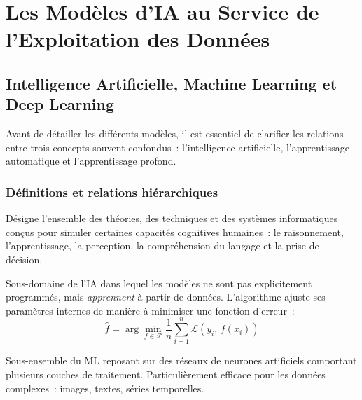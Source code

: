 \chapter{Les Modèles d'IA au Service de l'Exploitation des Données}


\section{Intelligence Artificielle, Machine Learning et Deep Learning}

Avant de détailler les différents modèles, il est essentiel de clarifier les relations entre trois concepts souvent confondus~: l'intelligence artificielle, l'apprentissage automatique et l'apprentissage profond.

\subsection{Définitions et relations hiérarchiques}

\begin{description}[leftmargin=1.5cm, itemsep=4pt]
  \item[Intelligence Artificielle (IA)] Désigne l'ensemble des théories, des techniques et des systèmes informatiques conçus pour simuler certaines capacités cognitives humaines~: le raisonnement, l'apprentissage, la perception, la compréhension du langage et la prise de décision.
  \item[Machine Learning (ML)] Sous-domaine de l'IA dans lequel les modèles ne sont pas explicitement programmés, mais \textit{apprennent} à partir de données. L'algorithme ajuste ses paramètres internes de manière à minimiser une fonction d'erreur~:
  \[
    \hat{f} = \arg\min_{f \in \mathcal{F}} \frac{1}{n}\sum_{i=1}^{n} \mathcal{L}\!\left(y_i,\, f(x_i)\right)
  \]
  \item[Deep Learning (DL)] Sous-ensemble du ML reposant sur des réseaux de neurones artificiels comportant plusieurs couches de traitement. Particulièrement efficace pour les données complexes~: images, textes, séries temporelles.
\end{description}

